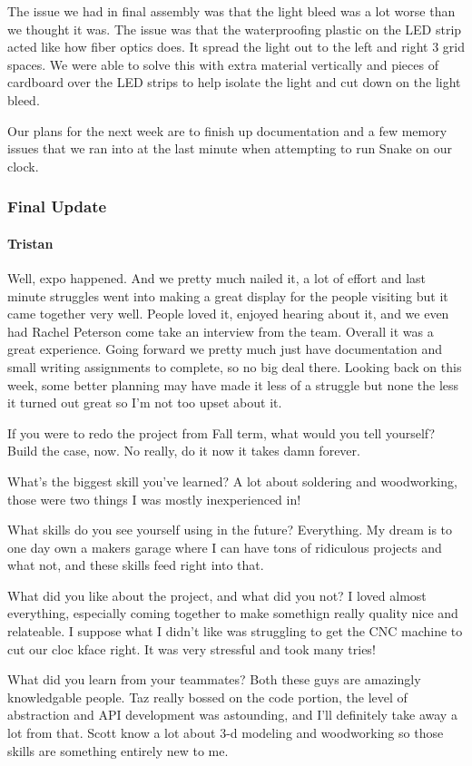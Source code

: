 \documentclass[onecolumn, draftclsnofoot,10pt, compsoc]{IEEEtran}
\begin{document}
The issue we had in final assembly was that the light bleed was a lot worse than we thought it was. The issue was that the waterproofing plastic on the LED strip acted like how fiber optics does. It spread the light out to the left and right 3 grid spaces. We were able to solve this with extra material vertically and pieces of cardboard over the LED strips to help isolate the light and cut down on the light bleed.

Our plans for the next week are to finish up documentation and a few memory issues that we ran into at the last minute when attempting to run Snake on our clock.
\subsubsection{Final Update}
\paragraph{Tristan}
Well, expo happened. And we pretty much nailed it, a lot of effort and last minute struggles went into making a great display for the people visiting but it came together very well. People loved it, enjoyed hearing about it, and we even had Rachel Peterson come take an interview from the team. Overall it was a great experience. Going forward we pretty much just have documentation and small writing assignments to complete, so no big deal there. Looking back on this week, some better planning may have made it less of a struggle but none the less it turned out great so I'm not too upset about it.

If you were to redo the project from Fall term, what would you tell yourself? Build the case, now. No really, do it now it takes damn forever.

What's the biggest skill you've learned? A lot about soldering and woodworking, those were two things I was mostly inexperienced in!

What skills do you see yourself using in the future? Everything. My dream is to one day own a makers garage where I can have tons of ridiculous projects and what not, and these skills feed right into that.

What did you like about the project, and what did you not? I loved almost everything, especially coming together to make somethign really quality nice and relateable. I suppose what I didn't like was struggling to get the CNC machine to cut our cloc kface right. It was very stressful and took many tries!

What did you learn from your teammates? Both these guys are amazingly knowledgable people. Taz really bossed on the code portion, the level of abstraction and API development was astounding, and I'll definitely take away a lot from that. Scott know a lot about 3-d modeling and woodworking so those skills are something entirely new to me.
\end{document}
